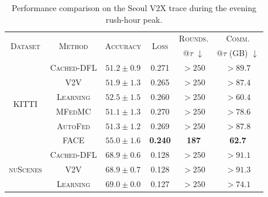 \begin{table}[t]
    \centering
\caption{Performance comparison on the Seoul V2X trace during the evening rush-hour peak.}
    \label{tab:seoul_results}
    \footnotesize
    \renewcommand{\arraystretch}{1.0}
    \setlength{\tabcolsep}{3pt}
    \begin{tabular}{c|c|c|c|c|c}
        \toprule
        \multirow{2}{*}{\textsc{Dataset}}
        & \multirow{2}{*}{\textsc{Method}}
        & \multirow{2}{*}{\textsc{Accuracy}}
        & \multirow{2}{*}{\textsc{Loss}}
        & \textsc{Rounds.}
        & \textsc{Comm.} \\

        &
        &
        &
        & @$\tau$ $\downarrow$
        & @$\tau$ (GB) $\downarrow$ \\
        \midrule

        \multirow{6}{*}{\textsc{KITTI}}
        & \textsc{Cached-DFL}
        & $51.2 \pm 0.9$
        & 0.271
        & $>250$
        & $>89.7$ \\

        & \textsc{V2V}
        & $51.9 \pm 1.3$
        & 0.265
        & $>250$
        & $>87.4$ \\

        & \textsc{Learning}
        & $52.5 \pm 1.5$
        & 0.260
        & $>250$
        & $>60.4$ \\[1pt]

        & \textsc{MFedMC}
        & $51.1 \pm 1.3$
        & 0.270
        & $>250$
        & $>78.6$ \\

        & \textsc{AutoFed}
        & $51.3 \pm 1.2$
        & 0.269
        & $>250$
        & $>87.8$ \\[1pt]

        & \textsc{FACE}
        & $\mathbf{55.0 \pm 1.6}$
        & \textbf{0.240}
        & \textbf{187}
        & \textbf{62.7} \\

        \midrule

        \multirow{6}{*}{\textsc{nuScenes}}
        & \textsc{Cached-DFL}
        & $68.9 \pm 0.6$
        & 0.128
        & $>250$
        & $>91.1$ \\

        & \textsc{V2V}
        & $68.9 \pm 0.7$
        & 0.128
        & $>250$
        & $>91.3$ \\

        & \textsc{Learning}
        & $69.0 \pm 0.0$
        & 0.127
        & $>250$
        & $>74.1$ \\[1pt]


\end{tabular}
\end{table}
